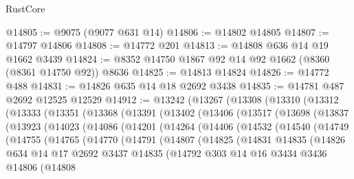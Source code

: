 \begin{lexlean}{RustCore}
\begin{coremodule}
@14805 := @9075 (@9077 @631 @14)
@14806 := @14802 @14805
@14807 := @14797 @14806
@14808 := @14772 @201
@14813 := @14808 @636 @14 @19 @1662 @3439
@14824 := @8352 @14750 @1867 @92 @14 @92 @1662 (@8360 (@8361 @14750 @92)) @8636
@14825 := @14813 @14824
@14826 := @14772 @488
@14831 := @14826 @635 @14 @18 @2692 @3438
@14835 := @14781 @487 @2692 @12525 @12529
@14912 := @13242
    (@13267
      (@13308
        (@13310
          (@13312
            (@13333
              (@13351
                (@13368
                  (@13391
                    (@13402
                      (@13406
                        (@13517
                          (@13698
                            (@13837
                              (@13923
                                (@14023
                                  (@14086
                                    (@14201
                                      (@14264
                                        (@14406
                                          (@14532
                                            (@14540
                                              (@14749
                                                (@14755
                                                  (@14765
                                                    (@14770
                                                      (@14791
                                                        (@14807
                                                          (@14825
                                                            (@14831
                                                              @14835
                                                              (@14826
                                                                @634
                                                                @14
                                                                @17
                                                                @2692
                                                                @3437
                                                                @14835
                                                                (@14792
                                                                  @303
                                                                  @14
                                                                  @16
                                                                  @3434
                                                                  @3436
                                                                  @14806
                                                                  (@14808

\end{coremodule}
\end{lexlean}
